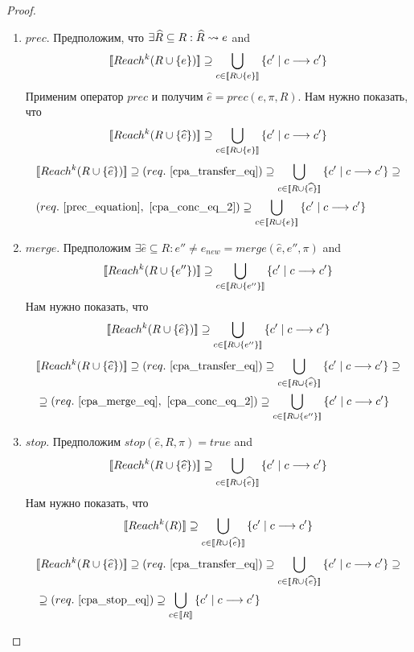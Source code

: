 \begin{proof}
\begin{enumerate}
\begin{enumerate}
\item $prec$. Предположим, что $\exists \widehat{R} \subseteq R: \widehat{R} \leadsto e$ and $$[\![ Reach^k(R \cup \{e\}) ]\!] \supseteq \bigcup_{c \in [\![ R \cup \{e\} ]\!]}{\{c' \mid c \longrightarrow c'\}}$$
Применим оператор $prec$ и получим $\widehat{e} = prec(e, \pi, R)$. Нам нужно показать, что $$[\![ Reach^k(R \cup \{\widehat{e}\}) ]\!] \supseteq \bigcup_{c \in [\![ R \cup \{e\} ]\!]}{\{c' \mid c \longrightarrow c'\}}$$
\begin{align}
& [\![ Reach^k(R \cup \{\widehat{e}\}) ]\!] \supseteq (req.~\ref{cpa_transfer_eq}) \supseteq \bigcup_{c \in [\![ R \cup \{\widehat{e}\} ]\!]}{\{c' \mid c \longrightarrow c'\}} \supseteq \nonumber \\
& (req.~\ref{prec_equation},~\ref{cpa_conc_eq_2}) \supseteq \bigcup_{c \in [\![ R \cup \{e\} ]\!]}{\{c' \mid c \longrightarrow c'\}} \nonumber
\end{align}

\item $merge$. Предположим $\exists \widehat{e} \subseteq R: e'' \neq e_{new} = merge(\widehat{e}, e'', \pi)$ and $$[\![ Reach^k(R \cup \{e''\}) ]\!] \supseteq \bigcup_{c \in [\![ R \cup \{e''\} ]\!]}{\{c' \mid c \longrightarrow c'\}}$$
Нам нужно показать, что $$[\![ Reach^k(R \cup \{\widehat{e}\}) ]\!] \supseteq \bigcup_{c \in [\![ R \cup \{e''\} ]\!]}{\{c' \mid c \longrightarrow c'\}}$$
\begin{align}
& [\![ Reach^k(R \cup \{\widehat{e}\}) ]\!] \supseteq (req.~\ref{cpa_transfer_eq}) \supseteq \bigcup_{c \in [\![ R \cup \{\widehat{e}\} ]\!]}{\{c' \mid c \longrightarrow c'\}} \supseteq \nonumber \\
& \supseteq (req.~\ref{cpa_merge_eq},~\ref{cpa_conc_eq_2}) \supseteq \bigcup_{c \in [\![ R \cup \{e''\} ]\!]}{\{c' \mid c \longrightarrow c'\}} \nonumber
\end{align}

\item $stop$. Предположим $stop(\widehat{e}, R, \pi) = true$ and $$[\![ Reach^k(R \cup \{\widehat{e}\}) ]\!] \supseteq \bigcup_{c \in [\![ R \cup \{\widehat{e}\} ]\!]}{\{c' \mid c \longrightarrow c'\}}$$
Нам нужно показать, что $$[\![ Reach^k(R) ]\!] \supseteq \bigcup_{c \in [\![ R \cup \{\widehat{e}\} ]\!]}{\{c' \mid c \longrightarrow c'\}}$$
\begin{align}
& [\![ Reach^k(R \cup \{\widehat{e}\}) ]\!] \supseteq (req.~\ref{cpa_transfer_eq}) \supseteq \bigcup_{c \in [\![ R \cup \{\widehat{e}\} ]\!]}{\{c' \mid c \longrightarrow c'\}} \supseteq \nonumber \\
& \supseteq (req.~\ref{cpa_stop_eq}) \supseteq \bigcup_{c \in [\![ R ]\!]}{\{c' \mid c \longrightarrow c'\}} \nonumber
\end{align}


\end{enumerate}
\end{enumerate}
\end{proof}
